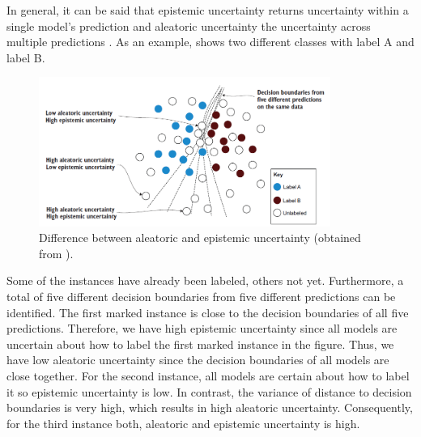 In general, it can be said that epistemic uncertainty returns uncertainty within a single model's prediction and aleatoric uncertainty the uncertainty across multiple predictions \cite{human-in-the-loop}.
As an example,  shows two different classes with label A and label B.
\begin{figure}[H]
  \centering
    \includegraphics[width=0.85\textwidth]{figures/uncertainty_differences.PNG}
  \caption{Difference between aleatoric and epistemic uncertainty (obtained from \cite{human-in-the-loop}).}
  \label{fig:differences_aleatoric_epistemic}
\end{figure}
Some of the instances have already been labeled, others not yet.
Furthermore, a total of five different decision boundaries from five different predictions can be identified.
The first marked instance is close to the decision boundaries of all five predictions.
Therefore, we have high epistemic uncertainty since all models are uncertain about how to label the first marked instance in the figure.
Thus, we have low aleatoric uncertainty since the decision boundaries of all models are close together.
For the second instance, all models are certain about how to label it so epistemic uncertainty is low.
In contrast, the variance of distance to decision boundaries is very high, which results in high aleatoric uncertainty.
Consequently, for the third instance both, aleatoric and epistemic uncertainty is high.